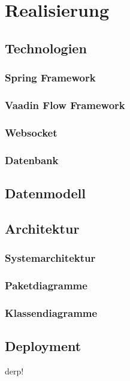 
\section{Realisierung} \label{sec:realisierung}

\subsection{Technologien} \label{subsec:technologien}

    \subsubsection{Spring Framework}
    \subsubsection{Vaadin Flow Framework}
    \subsubsection{Websocket}
    \subsubsection{Datenbank}


\subsection{Datenmodell} \label{subsec:datenmodell}

\subsection{Architektur}\label{subsec:architektur}

    \subsubsection{Systemarchitektur}
    \subsubsection{Paketdiagramme}
    \subsubsection{Klassendiagramme}

\subsection{Deployment} \label{subsec:deployment}

derp!